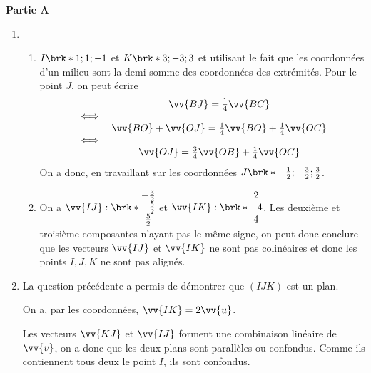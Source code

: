 \documentclass[12pt,a4paper,french]{article}
\theoremstyle{break}
\theoremstyle{plain}
\theoremstyle{nonumberplain}
\theoremstyle{nonumberbreak}
\begin{document}
\begin{solution}
  \textbf{Partie A}

  \begin{enumerate}
    \item
      \begin{enumerate}
        \item $I\brk*{1;1;-1}$ et $K\brk*{3;-3;3}$ et utilisant le fait
          que les coordonnées d'un milieu sont la demi-somme des
          coordonnées des extrémités. Pour le point $J$, on peut écrire
          \[
            \begin{array}{rc}
                   & \vv{BJ} = \frac14 \vv{BC} \\
              \iff &                           \\
                   & \vv{BO} + \vv{OJ} = \frac14 \vv{BO} + \frac14
              \vv{OC} \\
              \iff & \\
                   & \vv{OJ} = \frac34 \vv{OB} + \frac14 \vv{OC}
            \end{array}
          \]
          On a donc, en travaillant sur les coordonnées $J\brk*{-\frac12
          ; -\frac32 ; \frac32}$.
        \item On a $\vv{IJ} : \brk*{\begin{matrix}-\frac32 \\ -\frac52 \\
          \frac52 \end{matrix}}$ et $\vv{IK} : \brk*{\begin{matrix} 2
          \\ -4 \\ 4\end{matrix}}$.
          Les deuxième et troisième composantes n'ayant pas le même
          signe, on peut donc conclure que les vecteurs $\vv{IJ}$ et
          $\vv{IK}$ ne sont pas colinéaires et donc les points $I,J,K$
          ne sont pas alignés.
      \end{enumerate}
    \item La question précédente a permis de démontrer que $(IJK)$ est
      un plan.

      On a, par les coordonnées, $\vv{IK} = 2\vv{u}$.

      Les vecteurs $\vv{KJ}$ et $\vv{IJ}$ forment une combinaison
      linéaire de $\vv{v}$, on a donc que les deux plans sont parallèles
      ou confondus. Comme ils contiennent tous deux le point $I$, ils
      sont confondus.


\end{enumerate}
\end{solution}
\end{document}
